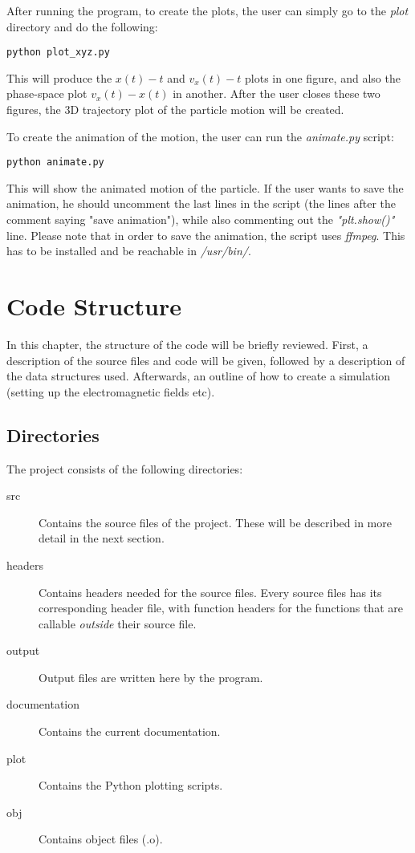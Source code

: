 \documentclass[11pt]{report}
\begin{document}
After running the program, to create the plots, the user can simply go to the \emph{plot} directory and do the following:

\begin{lstlisting}
python plot_xyz.py
\end{lstlisting}

This will produce the $x(t)-t$ and $v_x(t)-t$ plots in one figure, and also the phase-space plot $v_x(t) - x(t)$ in another. After the user closes these two figures, the 3D trajectory plot of the particle motion will be created.

To create the animation of the motion, the user can run the \emph{animate.py} script:

\begin{lstlisting}
python animate.py
\end{lstlisting}

This will show the animated motion of the particle. If the user wants to save the animation, he should uncomment the last lines in the script (the lines after the comment saying "save animation"), while also commenting out the \emph{"plt.show()"} line. Please note that in order to save the animation, the script uses \emph{ffmpeg}. This has to be installed and be reachable in \emph{/usr/bin/}.
 
\chapter{Code Structure}
In this chapter, the structure of the code will be briefly reviewed. First, a description of the source files and code will be given, followed by a description of the data structures used. Afterwards, an outline of how to create a simulation (setting up the electromagnetic fields etc).

\section{Directories}
The project consists of the following directories:

\begin{description}
\item[src] Contains the source files of the project. These will be described in more detail in the next section.
\item[headers] Contains headers needed for the source files. Every source files has its corresponding header file, with function headers for the functions that are callable \emph{outside} their source file.
\item[output] Output files are written here by the program.
\item[documentation] Contains the current documentation.
\item[plot] Contains the Python plotting scripts.
\item[obj] Contains object files (.o).
\end{description}
\end{document}
